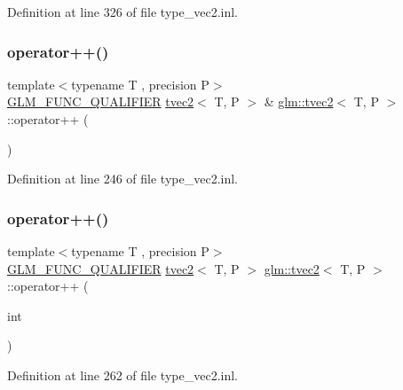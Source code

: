 Definition at line 326 of file type\+\_\+vec2.\+inl.

\mbox{\label{structglm_1_1tvec2_aee5dc4593579348b1f53ce6296337702}} 
\subsubsection{\texorpdfstring{operator++()}{operator++()}\hspace{0.1cm}{\footnotesize\ttfamily [1/2]}}
{\footnotesize\ttfamily template$<$typename T , precision P$>$ \\
\mbox{\hyperlink{setup_8hpp_a33fdea6f91c5f834105f7415e2a64407}{G\+L\+M\+\_\+\+F\+U\+N\+C\+\_\+\+Q\+U\+A\+L\+I\+F\+I\+ER}} \mbox{\hyperlink{structglm_1_1tvec2}{tvec2}}$<$ T, P $>$ \& \mbox{\hyperlink{structglm_1_1tvec2}{glm\+::tvec2}}$<$ T, P $>$\+::operator++ (\begin{DoxyParamCaption}{ }\end{DoxyParamCaption})}



Definition at line 246 of file type\+\_\+vec2.\+inl.

\mbox{\label{structglm_1_1tvec2_ab479786d89c64c96e9611c7c93fb29c5}} 
\subsubsection{\texorpdfstring{operator++()}{operator++()}\hspace{0.1cm}{\footnotesize\ttfamily [2/2]}}
{\footnotesize\ttfamily template$<$typename T , precision P$>$ \\
\mbox{\hyperlink{setup_8hpp_a33fdea6f91c5f834105f7415e2a64407}{G\+L\+M\+\_\+\+F\+U\+N\+C\+\_\+\+Q\+U\+A\+L\+I\+F\+I\+ER}} \mbox{\hyperlink{structglm_1_1tvec2}{tvec2}}$<$ T, P $>$ \mbox{\hyperlink{structglm_1_1tvec2}{glm\+::tvec2}}$<$ T, P $>$\+::operator++ (\begin{DoxyParamCaption}\item[{int}]{ }\end{DoxyParamCaption})}



Definition at line 262 of file type\+\_\+vec2.\+inl.


